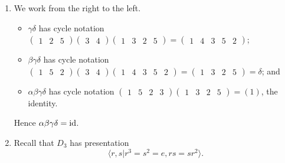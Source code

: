 \begin{enumerate}
    \item We work from the right to the left.
    \begin{itemize}
        \item $\gamma \delta$ has cycle notation $\begin{pmatrix}1 & 2 & 5\end{pmatrix}\begin{pmatrix}3 & 4\end{pmatrix}\begin{pmatrix}1 & 3 & 2 & 5\end{pmatrix} = \begin{pmatrix}1 & 4 & 3 & 5 & 2\end{pmatrix}$;
        \item $\beta \gamma \delta$ has cycle notation $\begin{pmatrix}1 & 5 & 2\end{pmatrix}\begin{pmatrix}3 & 4\end{pmatrix}\begin{pmatrix}1 & 4 & 3 & 5 & 2\end{pmatrix} = \begin{pmatrix}1 & 3 & 2 & 5\end{pmatrix} = \delta$; and
        \item $\alpha \beta \gamma \delta$ has cycle notation $\begin{pmatrix}1 & 5 & 2 & 3\end{pmatrix}\begin{pmatrix}1 & 3 & 2 & 5\end{pmatrix} = (1)$, the identity.
    \end{itemize}
    Hence $\alpha \beta \gamma \delta = \mathrm{id}$.

    \item Recall that $D_3$ has presentation
    \[
        \langle r, s \vert r^3 = s^2 = e, rs = sr^2 \rangle.
    \]


\end{enumerate}
